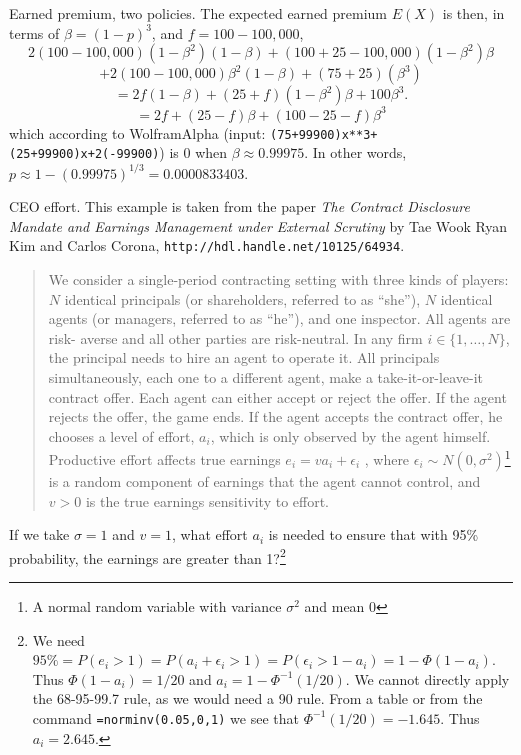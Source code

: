 \begin{example}{Earned premium, two policies.}
		The expected earned premium $E(X)$ is then, in terms of $\beta=(1-p)^3$, and $f=100-100,000$,
		\[
		2(100-100,000) (1-\beta^2)(1-\beta) +
		(100+25-100,000) (1-\beta^2)\beta
		\]
		\[ +
		2(100-100,000) \beta^2(1-\beta) +
		(75+25)(\beta^3)
		\]
		\[
			= 2f(1-\beta) + (25+f)(1-\beta^2)\beta + 100\beta^3.
		\]
		\[
			= 2f + (25-f)\beta + (100-25-f)\beta^3
		\]
		which according to WolframAlpha (input:
			\verb!(75+99900)x**3+(25+99900)x+2(-99900)!)
		is 0 when $\beta\approx 0.99975$. In other words,
		$p\approx 1-(0.99975)^{1/3}=0.0000833403$.
	\begin{example}{CEO effort.}
		This example is taken from the paper \emph{The Contract Disclosure Mandate and Earnings Management under External Scrutiny}
		by Tae Wook Ryan Kim and Carlos Corona, \verb!http://hdl.handle.net/10125/64934!.
		\begin{quote}
		We consider a single-period contracting setting with three kinds of players:
		$N$ identical principals (or shareholders, referred to as ``she''),
		$N$ identical agents (or managers, referred to as ``he''), and one inspector.
		All agents are risk- averse and all other parties are risk-neutral.
		In any firm $i \in \{1,\dots,N\}$, the principal needs to hire an agent to operate it.
		All principals simultaneously, each one to a different agent, make a take-it-or-leave-it contract offer.
		Each agent can either accept or reject the offer. If the agent rejects the offer, the game ends.
		If the agent accepts the contract offer, he chooses a level of effort, $a_i$, which is only observed by the agent himself.
		Productive effort affects true earnings $e_i = va_i + \epsilon_i$ , where $\epsilon_i\sim N(0,\sigma^2)$\footnote{A normal random variable with variance $\sigma^2$ and mean 0} is a random component of earnings that the agent cannot control, and $v > 0$ is the true earnings sensitivity to effort.
		\end{quote}
		If we take $\sigma=1$ and $v=1$, what effort $a_i$ is needed to ensure that with 95\% probability, the earnings are greater than 1?\footnote{We need $95\%=P(e_i>1)=P(a_i+\epsilon_i>1)=P(\epsilon_i>1-a_i)=1-\Phi(1-a_i)$. Thus $\Phi(1-a_i)=1/20$ and $a_i=1-\Phi^{-1}(1/20)$.
		We cannot directly apply the 68-95-99.7 rule, as we would need a 90 rule.
		From a table or from the command \texttt{=norminv(0.05,0,1)} we see that $\Phi^{-1}(1/20)=-1.645$.
		Thus $a_i=2.645$.
		}
	\end{example}
\end{example}